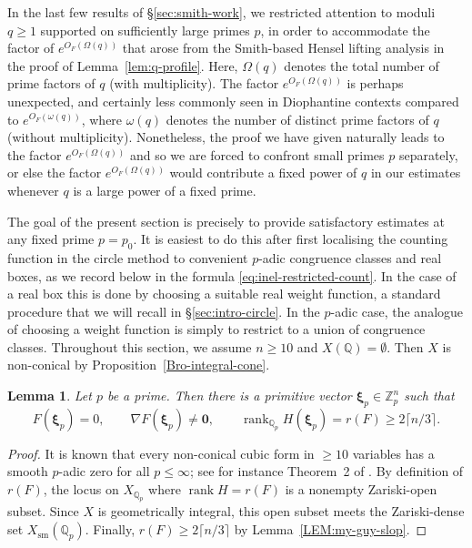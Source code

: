 \documentclass[a4paper,11pt, twoside,reqno]{amsart}
\theoremstyle{plain}
\newtheorem{lemma}[thm]{Lemma}
\theoremstyle{definition}
\theoremstyle{remark}
\newcommand{\Z}{\mathbb{Z}}
\newcommand{\QQ}{\mathbb{Q}}
\DeclareMathOperator{\rank}{rank}
\renewcommand{\le}{\leqslant}
\renewcommand{\ge}{\geqslant}
\numberwithin{equation}{section}
\begin{document}
In the last few results of \S\ref{sec:smith-work},
we restricted attention to moduli $q\ge 1$ supported on sufficiently large primes $p$,
in order to accommodate the factor of $e^{O_F(\Omega(q))}$
that arose from the Smith-based Hensel lifting analysis
in the proof of Lemma~\ref{lem:q-profile}.
Here, $\Omega(q)$ denotes the total number of prime factors of $q$ (with multiplicity).
The factor $e^{O_F(\Omega(q))}$ is perhaps unexpected,
and certainly less commonly seen in Diophantine contexts compared to
$e^{O_F(\omega(q))}$,
where $\omega(q)$ denotes the number of distinct prime factors of $q$
(without multiplicity).
Nonetheless, the proof we have given naturally leads to the factor $e^{O_F(\Omega(q))}$ and so we are forced to confront small primes $p$ separately,
or else the factor $e^{O_F(\Omega(q))}$ would contribute a fixed power of $q$
in our estimates
whenever $q$ is a large power of a fixed prime.

The goal of the present section is precisely to provide satisfactory
estimates at any fixed prime $p=p_0$.
It is easiest to do this after first localising the counting function in the circle method
to convenient $p$-adic congruence classes and real boxes,
as we record below in the formula \eqref{eq:inel-restricted-count}.
In the case of a real box this is done by choosing a suitable real weight function,
a standard procedure that we will recall in \S\ref{sec:intro-circle}.
In the $p$-adic case, the analogue of choosing a weight function is
simply to restrict to a union of congruence classes.
Throughout this section, we assume $n\ge 10$ and $X(\QQ) = \emptyset$.
Then $X$ is non-conical by Proposition~\ref{Bro-integral-cone}.

\begin{lemma}\label{lem:inel-high-rank-point}
Let $p$ be a prime.
Then there is a primitive vector $\boldsymbol{\xi}_p\in\Z_p^n$ such that
\[
 F(\boldsymbol{\xi}_p)=0,\qquad
 \nabla F(\boldsymbol{\xi}_p)\neq\bm 0,\qquad
 \rank_{\QQ_p}H(\boldsymbol{\xi}_p) = r(F) \ge 2 \lceil n/3 \rceil.
\]
\end{lemma}

\begin{proof}
It is known that every non-conical cubic form in $\ge 10$ variables has a smooth $p$-adic zero for all $p\le \infty$; see for instance Theorem~2 of
\cite{Ple71}.
By definition of $r(F)$, the locus on $X_{\QQ_p}$ where
$\rank H = r(F)$ is a nonempty Zariski-open subset.  Since $X$ is
geometrically integral, this open subset meets the Zariski-dense
set $X_{\mathrm{sm}}(\QQ_p)$.
Finally, $r(F)\ge 2\lceil n/3\rceil$ by Lemma~\ref{LEM:my-guy-slop}.
\end{proof}
\end{document}
